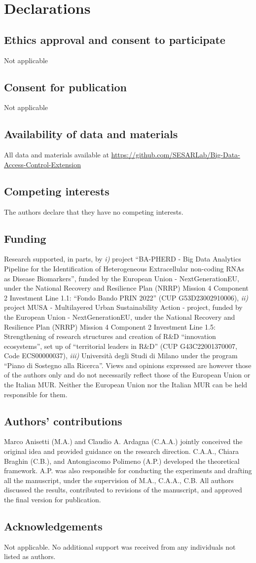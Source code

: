 \section{Declarations}
\subsection{Ethics approval and consent to participate}
Not applicable
\subsection{Consent for publication}
Not applicable
\subsection{Availability of data and materials}
All data and materials available at \url{https://github.com/SESARLab/Big-Data-Access-Control-Extension}
\subsection{Competing interests}
The authors declare that they have no competing interests.
\subsection{Funding}
Research supported, in parts, by \emph{i)} project ``BA-PHERD - Big Data Analytics Pipeline for the Identification of Heterogeneous Extracellular non-coding RNAs as Disease Biomarkers'', funded by the European Union - NextGenerationEU, under the National Recovery and Resilience Plan (NRRP) Mission 4 Component 2 Investment Line 1.1: “Fondo Bando PRIN 2022” (CUP G53D23002910006), \emph{ii)} project MUSA - Multilayered Urban Sustainability Action - project, funded by the European Union - NextGenerationEU, under the National Recovery and Resilience Plan (NRRP) Mission 4 Component 2 Investment Line 1.5: Strengthening of research structures and creation of R\&D ``innovation ecosystems'', set up of ``territorial leaders in R\&D'' (CUP  G43C22001370007, Code ECS00000037),  \emph{iii)} Università degli Studi di Milano under the program ``Piano di Sostegno alla Ricerca''. Views and opinions expressed are however those of the authors only and do not necessarily reflect those of the European Union or the Italian MUR. Neither the European Union nor the Italian MUR can be held responsible for them.
\subsection{Authors' contributions}
Marco Anisetti (M.A.) and Claudio A. Ardagna (C.A.A.) jointly conceived the original idea and provided guidance on the research direction. C.A.A., Chiara Braghin (C.B.), and Antongiacomo Polimeno (A.P.) developed the theoretical framework. A.P. was also responsible for conducting the experiments and drafting all the manuscript, under the supervision of M.A., C.A.A., C.B. All authors discussed the results, contributed to revisions of the manuscript, and approved the final version for publication.

\subsection{Acknowledgements}
Not applicable. No additional support was received from any individuals not listed as authors.